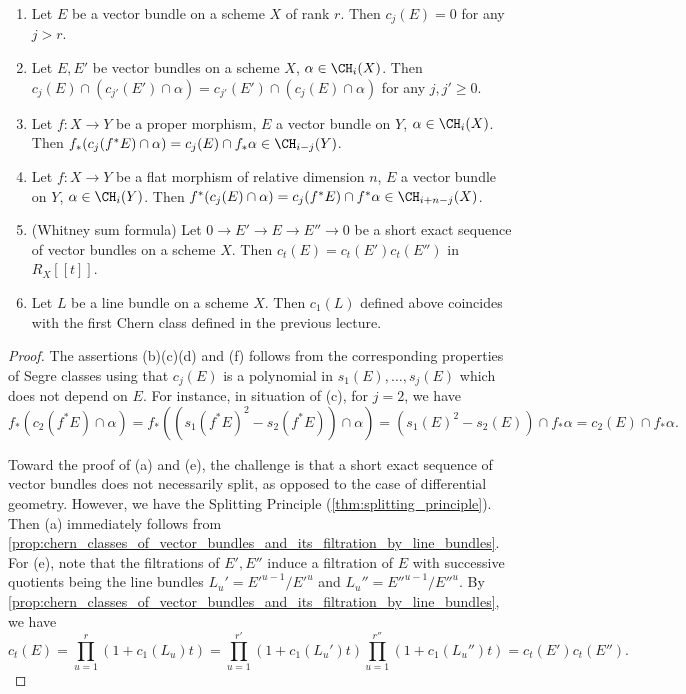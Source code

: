   \begin{theorem}
    \begin{enumerate}
      \item Let $E$ be a vector bundle on a scheme $X$ of rank $r$.
        Then $c_j(E) = 0$ for any $j > r$.
      \item Let $E,E'$ be vector bundles on a scheme $X$, $\alpha \in \CH_i(X)$.
        Then $c_j(E) \cap (c_{j'}(E') \cap \alpha) = c_{j'}(E') \cap (c_j(E) \cap \alpha)$ for any $j,j' \geq 0$.
      \item Let $f: X \to Y$ be a proper morphism, $E$ a vector bundle on $Y$, $\alpha \in \CH_i(X)$.
        Then $f_* (c_j(f^* E) \cap \alpha) = c_j(E) \cap f_* \alpha \in \CH_{i-j}(Y)$.
      \item Let $f: X \to Y$ be a flat morphism of relative dimension $n$, $E$ a vector bundle on $Y$, $\alpha \in \CH_i(Y)$.
        Then $f^* (c_j(E) \cap \alpha) = c_j(f^* E) \cap f^* \alpha \in \CH_{i+n-j}(X)$.
      \item (Whitney sum formula) Let $0 \to E' \to E \to E'' \to 0$ be a short exact sequence of vector bundles on a scheme $X$.
        Then $c_t(E) = c_t(E') c_t(E'')$ in $R_X [[t]]$.
      \item Let $L$ be a line bundle on a scheme $X$.
        Then $c_1(L)$ defined above coincides with the first Chern class defined in the previous lecture.
    \end{enumerate}
  \end{theorem}
  \begin{proof}
    The assertions (b)(c)(d) and (f) follows from the corresponding properties of Segre classes using that $c_j(E)$ is a polynomial in $s_1(E), \dots, s_j(E)$ which does not depend on $E$.
    For instance, in situation of (c), for $j = 2$, we have
    \[ f_* (c_2(f^* E) \cap \alpha) = f_* ((s_1(f^* E)^2 - s_2(f^* E)) \cap \alpha) = (s_1(E)^2 - s_2(E)) \cap f_* \alpha = c_2(E) \cap f_* \alpha. \]

    Toward the proof of (a) and (e), the challenge is that a short exact sequence of vector bundles does not necessarily split, as opposed to the case of differential geometry.
    However, we have the Splitting Principle (\cref{thm:splitting_principle}).
    Then (a) immediately follows from \cref{prop:chern_classes_of_vector_bundles_and_its_filtration_by_line_bundles}.
    For (e), note that the filtrations of $E', E''$ induce a filtration of $E$ with successive quotients being the line bundles $L_u' = E'^{u-1} / E'^u$ and $L_u'' = E''^{u-1} / E''^u$.
    By \cref{prop:chern_classes_of_vector_bundles_and_its_filtration_by_line_bundles}, we have
    \[ c_t(E) = \prod_{u=1}^r (1 + c_1(L_u) t) = \prod_{u=1}^{r'} (1 + c_1(L_u') t) \prod_{u=1}^{r''} (1 + c_1(L_u'') t) = c_t(E') c_t(E''). \]
  \end{proof}

